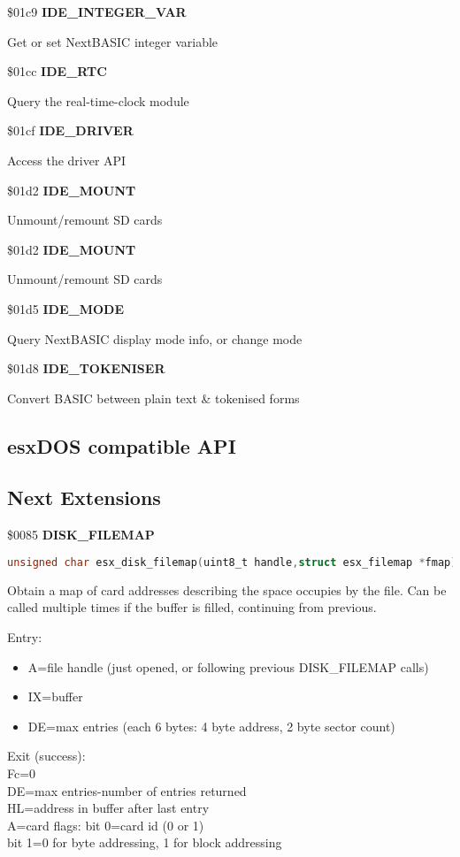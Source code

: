 \$01c9 \textbf{IDE\_INTEGER\_VAR}

Get or set NextBASIC integer variable

\$01cc \textbf{IDE\_RTC}

Query the real-time-clock module

\$01cf \textbf{IDE\_DRIVER}

Access the driver API

\$01d2 \textbf{IDE\_MOUNT}

Unmount/remount SD cards

\$01d2 \textbf{IDE\_MOUNT}

Unmount/remount SD cards

\$01d5 \textbf{IDE\_MODE}

Query NextBASIC display mode info, or change mode

\$01d8 \textbf{IDE\_TOKENISER}

Convert BASIC between plain text \& tokenised forms


\subsection{esxDOS compatible API}

\subsection{Next Extensions}

\$0085 \textbf{DISK\_FILEMAP}

\begin{lstlisting}[language=C]
unsigned char esx_disk_filemap(uint8_t handle,struct esx_filemap *fmap)
\end{lstlisting}

Obtain a map of card addresses describing the space occupies by the
file. Can be called multiple times if the buffer is filled, continuing
from previous.

Entry:
\begin{itemize}
\item[] A=file handle (just opened, or following previous DISK\_FILEMAP calls)
\item[] IX=buffer
\item[] DE=max entries (each 6 bytes: 4 byte address, 2 byte sector count)
\end{itemize}
Exit (success):\\
Fc=0\\
DE=max entries-number of entries returned\\
HL=address in buffer after last entry\\
A=card flags: bit 0=card id (0 or 1)\\
bit 1=0 for byte addressing, 1 for block addressing

